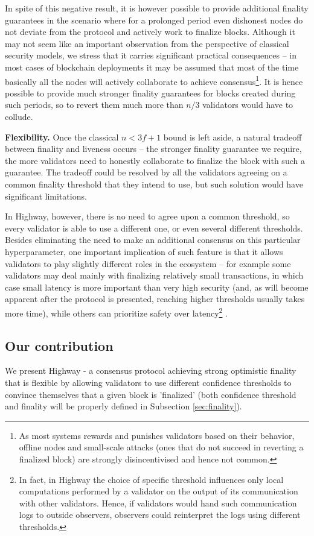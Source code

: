 \documentclass[12pt, fleqn]{article}
\begin{document}
In spite of this negative result, it is however possible to provide additional finality guarantees in the scenario where for a prolonged period even dishonest nodes do not deviate from the protocol and actively work to finalize blocks.
Although it may not seem like an important observation from the perspective of classical security models, we stress that it carries significant practical consequences -- in most cases of blockchain deployments it may be assumed that most of the time basically all the nodes will actively collaborate to achieve consensus\footnote{As most systems rewards and punishes validators based on their behavior, offline nodes and small-scale attacks (ones that do not succeed in reverting a finalized block) are strongly disincentivised and hence not common.}.
It is hence possible to provide much stronger finality guarantees for blocks created during such periods, so to revert them much more than $n/3$ validators would have to collude.


{\bf Flexibility.}
Once the classical $n<3f+1$ bound is left aside, a natural tradeoff between finality and liveness occurs -- the stronger finality guarantee we require, the more validators need to honestly collaborate to finalize the block with such a guarantee.
The tradeoff could be resolved by all the validators agreeing on a common finality threshold that they intend to use, but such solution would have significant limitations.

In Highway, however, there is no need to agree upon a common threshold, so every validator is able to use a different one, or even several different thresholds.
Besides eliminating the need to make an additional consensus on this particular hyperparameter, one important implication of such feature is that it allows validators to play slightly different roles in the ecosystem -- for example some validators may deal mainly with finalizing relatively small transactions, in which case small latency is more important than very high security (and, as will become apparent after the protocol is presented, reaching higher thresholds usually takes more time), while others can prioritize safety over latency\footnote{In fact, in Highway the choice of specific threshold influences only local computations performed by a validator on the output of its communication with other validators. Hence, if validators would hand such communication logs to outside observers, observers could reinterpret the logs using different thresholds.} .


\subsection{Our contribution}
We present Highway - a consensus protocol achieving strong optimistic finality that is flexible by allowing validators to use different confidence thresholds to convince themselves that a given block is 'finalized' (both confidence threshold and finality will be properly defined in Subsection \ref{sec:finality}). 
\end{document}
